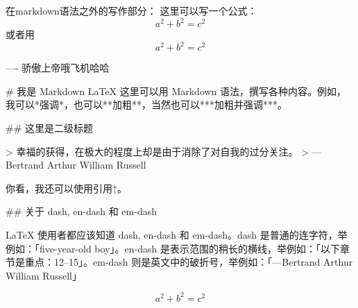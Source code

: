 \documentclass[UTF8]{ctexart}
\begin{document}
在markdown语法之外的写作部分：
这里可以写一个公式：
$$a^2+b^2=c^2$$
或者用
\begin{equation}
\label{eq1}
a^2+b^2=c^2
\end{equation}

----
骄傲上帝哦飞机哈哈

\begin{markdown}
# 我是 Markdown
\LaTeX  
这里可以用 Markdown 语法，撰写各种内容。例如，我可以*强调*，也可以**加粗**，当然也可以***加粗并强调***。

## 这里是二级标题

> 幸福的获得，在极大的程度上却是由于消除了对自我的过分关注。
> ---Bertrand Arthur William Russell

你看，我还可以使用引用↑。

## 关于 dash, en-dash 和 em-dash

LaTeX 使用者都应该知道 dash, en-dash 和 em-dash。dash 是普通的连字符，举例如：「five-year-old boy」。en-dash 是表示范围的稍长的横线，举例如：「以下章节是重点：12--15」。em-dash 则是英文中的破折号，举例如：「---Bertrand Arthur William Russell」
\end{markdown}

\begin{equation}
\label{eq2}
a^2+b^2=c^2
\end{equation}
\end{document}
